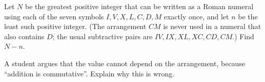 Let $N$ be the greatest positive integer that can be written as a Roman numeral using each of the seven symbols $I,V,X,L,C,D,M$ exactly once, and let $n$ be the least such positive integer. (The arrangement $CM$ is never used in a numeral that also contains $D$; the usual subtractive pairs are $IV,IX,XL,XC,CD,CM$.) Find $N-n$.

A student argues that the value cannot depend on the arrangement, because ``addition is commutative''. Explain why this is wrong.
